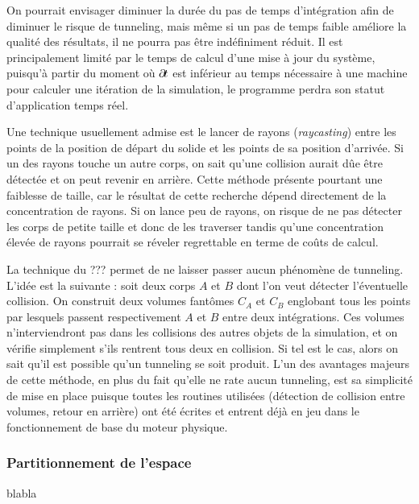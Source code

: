 \begin{figure}
  \centering
  
  \label{tunneling1}
\end{figure}

On pourrait envisager diminuer la durée du pas de temps d'intégration
afin de diminuer le risque de tunneling, mais même si un pas de temps
faible améliore la qualité des résultats, il ne pourra pas être
indéfiniment réduit. Il est principalement limité par le temps de
calcul d'une mise à jour du système, puisqu'à partir du moment o\`u
$\partial \! t$ est inférieur au temps nécessaire à une machine pour
calculer une itération de la simulation, le programme perdra son
statut d'application temps réel.

Une technique usuellement admise est le lancer de rayons
(\textit{raycasting}) entre les points de la position de départ du
solide et les points de sa position d'arrivée. Si un des rayons touche
un autre corps, on sait qu'une collision aurait dûe être détectée et
on peut revenir en arrière. Cette méthode présente pourtant une
faiblesse de taille, car le résultat de cette recherche dépend
directement de la concentration de rayons. Si on lance peu de rayons,
on risque de ne pas détecter les corps de petite taille et donc de les
traverser tandis qu'une concentration élevée de rayons pourrait se
réveler regrettable en terme de coûts de calcul.

\begin{figure}
  \centering
  
  \label{tunneling2}
\end{figure}

La technique du ??? permet de ne laisser passer aucun phénomène de
tunneling. L'idée est la suivante : soit deux corps $A$ et $B$ dont
l'on veut détecter l'éventuelle collision. On construit deux volumes
fantômes $C_A$ et $C_B$ englobant tous les points par lesquels passent
respectivement $A$ et $B$ entre deux intégrations. Ces volumes
n'interviendront pas dans les collisions des autres objets de la
simulation, et on vérifie simplement s'ils rentrent tous deux en
collision. Si tel est le cas, alors on sait qu'il est possible qu'un
tunneling se soit produit. L'un des avantages majeurs de cette
méthode, en plus du fait qu'elle ne rate aucun tunneling, est sa
simplicité de mise en place puisque toutes les routines utilisées
(détection de collision entre volumes, retour en arrière) ont été
écrites et entrent déjà en jeu dans le fonctionnement de base du
moteur physique.

\begin{figure}
  \centering
  
  \label{tunneling3}
\end{figure}

\subsubsection{Partitionnement de l'espace}

blabla
